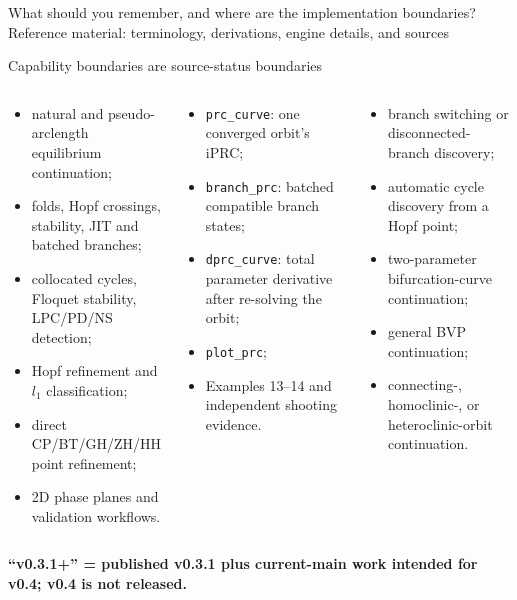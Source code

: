   {What should you remember, and where are the implementation boundaries?}
  {Reference material: terminology, derivations, engine details, and sources}

\begin{frame}{Capability boundaries are source-status boundaries}
\scriptsize
\begin{columns}[T,onlytextwidth]
\begin{block}{\releasedbadge}
\begin{itemize}
  \item natural and pseudo-arclength equilibrium continuation;
  \item folds, Hopf crossings, stability, JIT and batched branches;
  \item collocated cycles, Floquet stability, LPC/PD/NS detection;
  \item Hopf refinement and $l_1$ classification;
  \item direct CP/BT/GH/ZH/HH point refinement;
  \item 2D phase planes and validation workflows.
\end{itemize}
\end{block}

\begin{block}{\mainbadge}
\begin{itemize}
  \item \texttt{prc\_curve}: one converged orbit's iPRC;
  \item \texttt{branch\_prc}: batched compatible branch states;
  \item \texttt{dprc\_curve}: total parameter derivative after re-solving the orbit;
  \item \texttt{plot\_prc};
  \item Examples 13--14 and independent shooting evidence.
\end{itemize}
\end{block}

\begin{block}{\futurebadge}
\begin{itemize}
  \item branch switching or disconnected-branch discovery;
  \item automatic cycle discovery from a Hopf point;
  \item two-parameter bifurcation-curve continuation;
  \item general BVP continuation;
  \item connecting-, homoclinic-, or heteroclinic-orbit continuation.
\end{itemize}
\end{block}
\end{columns}

\vfill
\centering
\textbf{``v0.3.1+'' = published v0.3.1 plus current-main work intended for v0.4; v0.4 is not released.}
\end{frame}

